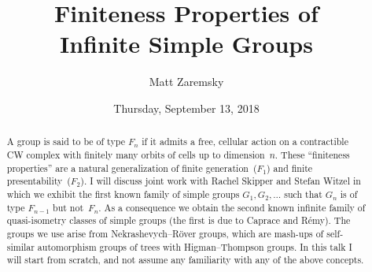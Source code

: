 \documentclass{UAmathtalk}
\author{Matt Zaremsky}
\title{Finiteness Properties of\\ Infinite Simple Groups}
\date{Thursday, September 13, 2018}
\begin{document}
\maketitle

\begin{abstract}
A group is said to be of type $F_n$ if it admits a free, cellular action on a contractible CW complex with finitely many orbits of cells up to dimension~$n$. These ``finiteness properties'' are a natural generalization of finite generation~($F_1$) and finite presentability~($F_2$). I will discuss joint work with Rachel Skipper and Stefan Witzel in which we exhibit the first known family of simple groups $G_1,G_2,\dots$ such that $G_n$ is of type $F_{n-1}$ but not~$F_n$. As a consequence we obtain the second known infinite family of quasi-isometry classes of simple groups (the first is due to Caprace and R\'emy). The groups we use arise from Nekrashevych--R\"over groups, which are mash-ups of self-similar automorphism groups of trees with Higman--Thompson groups. In this talk I will start from scratch, and not assume any familiarity with any of the above concepts.
\end{abstract}
\end{document}
